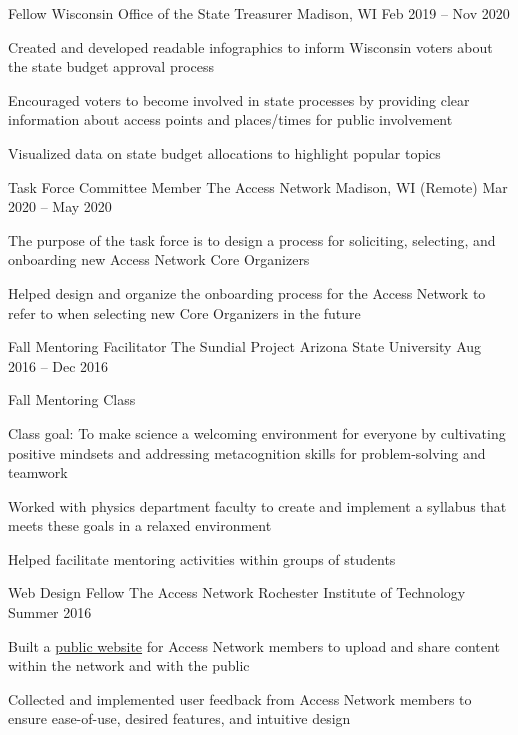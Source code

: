 \begin{cventries}
\cventry
    {Fellow}
    {Wisconsin Office of the State Treasurer}
    {Madison, WI}
    {Feb 2019 -- Nov 2020}
    {
    \begin{cvitems}
       \item {Created and developed readable infographics to inform Wisconsin voters about the state budget approval process}
       \item {Encouraged voters to become involved in state processes by providing clear information about access points and places/times for public involvement}
       \item {Visualized data on state budget allocations to highlight popular topics}
    \end{cvitems}
    }
    
\cventry
    {Task Force Committee Member}
    {The Access Network}
    {Madison, WI (Remote)}
    {Mar 2020 -- May 2020}
    {
    \begin{cvitems}
        \item {The purpose of the task force is to design a process for soliciting, selecting, and onboarding new Access Network Core Organizers}
        \item {Helped design and organize the onboarding process for the Access Network to refer to when selecting new Core Organizers in the future}
    \end{cvitems}
    }
    
\cventry
    {Fall Mentoring Facilitator}
    {The Sundial Project}
    {Arizona State University}
    {Aug 2016 -- Dec 2016}
    {
    \begin{cvitems}
        \item {Fall Mentoring Class}
        \item {Class goal: To make science a welcoming environment for everyone by cultivating positive mindsets and addressing metacognition skills for problem-solving and teamwork}
        \item {Worked with physics department faculty to create and implement a syllabus that meets these goals in a relaxed environment}
        \item {Helped facilitate mentoring activities within groups of students}
    \end{cvitems}
    }
    
\cventry
    {Web Design Fellow}
    {The Access Network}
    {Rochester Institute of Technology}
    {Summer 2016}
    {
    \begin{cvitems}
        \item {Built a \href{https://accessnetwork.org/}{public website} for Access Network members to upload and share content within the network and with the public}
        \item {Collected and implemented user feedback from Access Network members to ensure ease-of-use, desired features, and intuitive design}
    \end{cvitems}
    }
    

\end{cventries}
